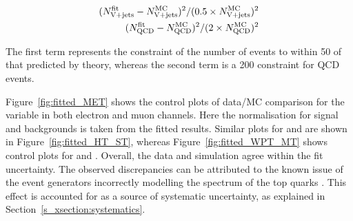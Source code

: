 \begin{align}
\label{eq:xsection_fit_constraints}
(N_{\mathrm{V}+\textrm{jets}}^\mathrm{fit}-N_{\mathrm{V}+\textrm{jets}}^\mathrm{MC})^2/(0.5 \times N_{\mathrm{V}+\textrm{jets}}^\mathrm{MC})^2 \\
(N_\mathrm{QCD}^\mathrm{fit}-N_\mathrm{QCD}^\mathrm{MC})^2/(2\times N_\mathrm{QCD}^\mathrm{MC})^2
\end{align}

The first term represents the constraint of the number of \VpJets events to within \SI{50}{\pc} of that predicted by
theory, whereas the second term is a \SI{200}{\pc} constraint for QCD events.

Figure~\ref{fig:fitted_MET} shows the control plots of data/MC comparison for the \MET variable in both electron and
muon channels. Here the normalisation for signal and backgrounds is taken from the fitted results. Similar plots for \HT
and \ST are shown in Figure~\ref{fig:fitted_HT_ST}, whereas Figure~\ref{fig:fitted_WPT_MT} shows control plots for \WPT
and \MT. Overall, the data and simulation agree within the fit uncertainty. The observed discrepancies can be attributed
to the known issue of the event generators incorrectly modelling the \pt spectrum of the top quarks
\autocite{ttbar_differential_xsection_7TeV, ttbar_differential_xsection_8TeV}. This effect is accounted for as a source
of systematic uncertainty, as explained in Section~\ref{s_xsection:systematics}.

